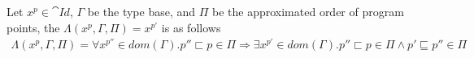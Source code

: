 \documentclass[../../master.tex]{subfiles}
\begin{document}
\begin{definition}
	Let $x^p\in \cat{Id}$, $\Gamma$ be the type base, and $\Pi$ be the approximated order of program points, the $\Lambda(x^p,\Gamma,\Pi)=x^{p'}$ is as follows
	\begin{align*}
		\Lambda(x^p,\Gamma,\Pi)=\forall x^{p''}\in dom(\Gamma). p''\sqsubset p\in\Pi\Rightarrow \exists x^{p'}\in dom(\Gamma).p''\sqsubset p\in\Pi\wedge p'\sqsubseteq p''\in\Pi
	\end{align*}
\end{definition}

%
\end{document}
